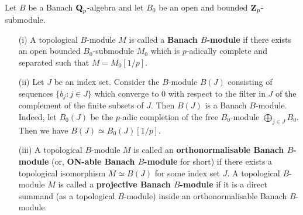 \begin{Definition}\label{Definition: Banach modules}
Let $B$ be a Banach $\operatorname{\mathbf{Q}}_p$-algebra and let $B_0$ be an open and bounded $\operatorname{\mathbf{Z}}_p$-submodule. 
\begin{enumerate}
\item[(i)] A topological $B$-module $M$ is called a \textbf{Banach $B$-module} if there exists an open bounded $B_0$-submodule $M_0$ which is $p$-adically complete and separated such that $M=M_0[1/p]$.
\item[(ii)] Let $J$ be an index set. Consider the $B$-module $B(J)$ consisting of sequences $\{b_j: j\in J\}$ which converge to 0 with respect to the filter in $J$ of the complement of the finite subsets of $J$.
Then $B(J)$ is a Banach $B$-module. Indeed, let $B_0(J)$ be the $p$-adic completion of the free $B_0$-module $\bigoplus_{j\in J} B_0$. Then we have $B(J)\simeq B_0(J)[1/p]$.
\item[(iii)] A topological $B$-module $M$ is called an \textbf{orthonormalisable Banach $B$-module} (or, \textbf{ON-able Banach $B$-module} for short) if there exists a topological isomorphism $M\simeq B(J)$ for some index set $J$. A topological $B$-module $M$ is called a \textbf{projective Banach $B$-module} if it is a direct summand (as a topological $B$-module) inside an orthonormalisable Banach $B$-module.
\end{enumerate}
\end{Definition}

